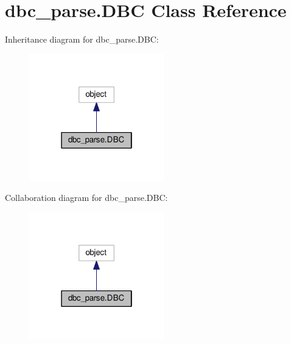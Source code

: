 \hypertarget{classdbc__parse_1_1DBC}{}\section{dbc\+\_\+parse.\+D\+BC Class Reference}
\label{classdbc__parse_1_1DBC}


Inheritance diagram for dbc\+\_\+parse.\+D\+BC\+:\nopagebreak
\begin{figure}[H]
\begin{center}
\leavevmode
\includegraphics[width=166pt]{d5/dd3/classdbc__parse_1_1DBC__inherit__graph}
\end{center}
\end{figure}


Collaboration diagram for dbc\+\_\+parse.\+D\+BC\+:\nopagebreak
\begin{figure}[H]
\begin{center}
\leavevmode
\includegraphics[width=166pt]{d9/df0/classdbc__parse_1_1DBC__coll__graph}
\end{center}
\end{figure}
